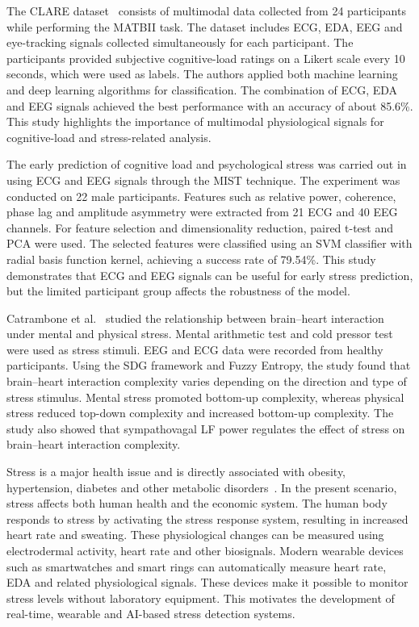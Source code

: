 \documentclass[12pt,a4paper]{report}
\begin{document}
The CLARE dataset~\cite{b2} consists of multimodal data collected from 24 participants while performing the MATBII task. The dataset includes ECG, EDA, EEG and eye-tracking signals collected simultaneously for each participant. The participants provided subjective cognitive-load ratings on a Likert scale every 10 seconds, which were used as labels. The authors applied both machine learning and deep learning algorithms for classification. The combination of ECG, EDA and EEG signals achieved the best performance with an accuracy of about 85.6\%. This study highlights the importance of multimodal physiological signals for cognitive-load and stress-related analysis.

The early prediction of cognitive load and psychological stress was carried out in~\cite{b3} using ECG and EEG signals through the MIST technique. The experiment was conducted on 22 male participants. Features such as relative power, coherence, phase lag and amplitude asymmetry were extracted from 21 ECG and 40 EEG channels. For feature selection and dimensionality reduction, paired t-test and PCA were used. The selected features were classified using an SVM classifier with radial basis function kernel, achieving a success rate of 79.54\%. This study demonstrates that ECG and EEG signals can be useful for early stress prediction, but the limited participant group affects the robustness of the model.

Catrambone et al.~\cite{b4} studied the relationship between brain--heart interaction under mental and physical stress. Mental arithmetic test and cold pressor test were used as stress stimuli. EEG and ECG data were recorded from healthy participants. Using the SDG framework and Fuzzy Entropy, the study found that brain--heart interaction complexity varies depending on the direction and type of stress stimulus. Mental stress promoted bottom-up complexity, whereas physical stress reduced top-down complexity and increased bottom-up complexity. The study also showed that sympathovagal LF power regulates the effect of stress on brain--heart interaction complexity.

Stress is a major health issue and is directly associated with obesity, hypertension, diabetes and other metabolic disorders~\cite{b5}. In the present scenario, stress affects both human health and the economic system. The human body responds to stress by activating the stress response system, resulting in increased heart rate and sweating. These physiological changes can be measured using electrodermal activity, heart rate and other biosignals. Modern wearable devices such as smartwatches and smart rings can automatically measure heart rate, EDA and related physiological signals. These devices make it possible to monitor stress levels without laboratory equipment. This motivates the development of real-time, wearable and AI-based stress detection systems.
\end{document}

